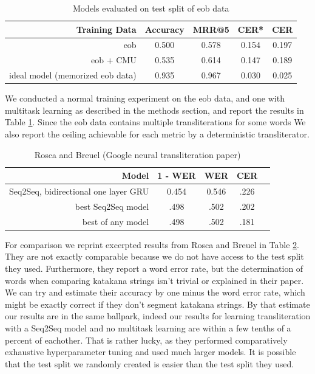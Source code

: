 \documentclass{article}
\begin{document}
\begin{table}[h]
  \centering
  \begin{tabular}{r | c c c c}
    \toprule
    Training Data & Accuracy & MRR@5 & CER* & CER \\
    \midrule
    eob & 0.500 & 0.578 & 0.154 & 0.197 \\
    eob + CMU & 0.535 & 0.614 & 0.147 & 0.189 \\
    \midrule
    ideal model (memorized eob data) & 0.935 & 0.967 & 0.030 & 0.025 \\
    \bottomrule
  \end{tabular}
  \caption{Models evaluated on test split of eob data}
  \label{tab:eob-results}
\end{table}

We conducted a normal training experiment on the eob data,
and one with multitask learning as described in the methods section,
and report the results in Table \ref{tab:eob-results}.
Since the eob data contains multiple transliterations for some words
We also report the ceiling achievable for each metric
by a deterministic transliterator.

\begin{table}[h]
  \centering
  \begin{tabular}{r | c c c c}
    \toprule
    Model & 1 - WER & WER & CER \\
    \midrule{}
    Seq2Seq, bidirectional one layer GRU & 0.454 & 0.546 & .226 \\
    best Seq2Seq model & .498 & .502 & .202 \\
    best of any model & .498 & .502 & .181 \\
    \bottomrule
  \end{tabular}
  \caption{Rosca and Breuel \cite{Rosca2016SequencetosequenceNN} (Google neural
    transliteration paper)}
  \label{tab:baseline-results}
\end{table}

For comparison we reprint excerpted results
from Rosca and Breuel \cite{Rosca2016SequencetosequenceNN}
in Table \ref{tab:baseline-results}.
They are not exactly comparable
because we do not have access to the test split they used.
Furthermore,
they report a word error rate,
but the determination of words when comparing katakana strings
isn't trivial or explained in their paper.
We can try and estimate their accuracy
by one minus the word error rate,
which might be exactly correct if they don't segment katakana strings.
By that estimate our results are in the same ballpark,
indeed our results for learning transliteration
with a Seq2Seq model and no multitask learning
are within a few tenths of a percent of eachother.
That is rather lucky,
as they performed comparatively exhaustive hyperparameter tuning
and used much larger models.
It is possible that the test split we randomly created
is easier than the test split they used.
\end{document}
